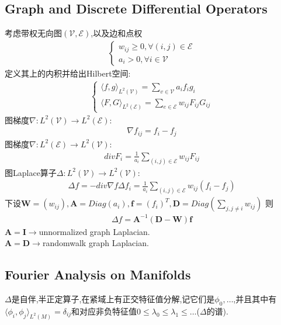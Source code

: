 \documentclass{article}
\begin{document}
\subsection{Graph and Discrete Differential Operators}
考虑带权无向图$(\mathcal{V},\mathcal{E})$,以及边和点权
\begin{align}
    \begin{cases}
        w_{ij} \ge 0,\forall (i,j)\in \mathcal E\\
        a_i > 0 ,\forall i\in \mathcal V
    \end{cases}
\end{align}
定义其上的内积并给出Hilbert空间:
\begin{align}
    \begin{cases}
        \langle f, g \rangle_{L^2(\mathcal V)}=\sum_{v\in \mathcal V}a_if_ig_i\\
        \langle F, G \rangle_{L^2(\mathcal E)}=\sum_{e\in \mathcal E}w_{ij}F_{ij}G_{ij}
    \end{cases}
\end{align}
图梯度$\nabla:L^2(\mathcal V)\rightarrow L^2(\mathcal{E})$:
\begin{align}
    \nabla f_{ij}=f_i-f_j
\end{align}
图梯度$\nabla:L^2(\mathcal E)\rightarrow L^2(\mathcal{V})$:
\begin{align}
    div F_{i}=\frac{1}{a_i}\sum_{(i,j)\in \mathcal{E}}w_{ij}F_{ij}
\end{align}
图Laplace算子$\Delta:L^2(\mathcal V)\rightarrow L^2(\mathcal{V})$:
\begin{align}
    \Delta f=-div \nabla f
    \Delta f_i=\frac{1}{a_i}\sum_{(i,j)\in \mathcal{E}}w_{ij}(f_i-f_j)
\end{align}
下设$\mathbf{W}=(w_{ij}),\mathbf{A}=Diag(a_i),\mathbf{f}=(f_i)^T,\mathbf{D}=Diag(\sum_{j,j\neq i}w_{ij})$
则
\begin{align}
    \Delta f=\mathbf{A}^{-1}(\mathbf{D}-\mathbf{W})\mathbf{f}
\end{align}
$\mathbf{A}=\mathbf{I}\rightarrow$unnormalized graph Laplacian.\\
$\mathbf{A}=\mathbf{D}\rightarrow$randomwalk graph Laplacian.

\subsection{Fourier Analysis on Manifolds}
$\Delta$是自伴,半正定算子,在紧域上有正交特征值分解,记它们是$\phi_0,\dots$,并且其中有$\langle \phi_i, \phi_j \rangle_{L^2(M)}=\delta_{ij}$和对应非负特征值$0\le \lambda_0\le \lambda_1 \le \dots$($\Delta$的谱).
 
\end{document}
